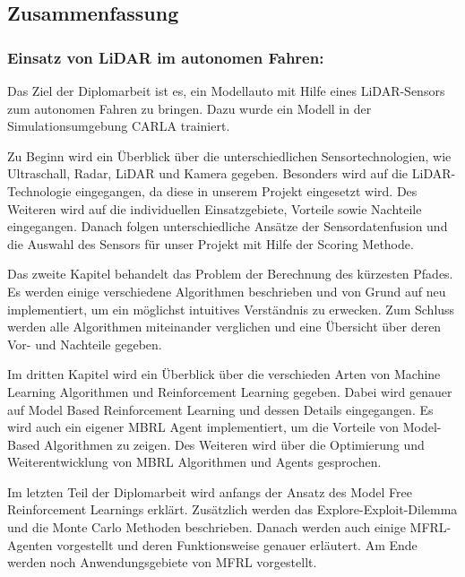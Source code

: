 \begin{flushleft}
	
	\subsection*{Zusammenfassung}

    	\subsubsection*{Einsatz von LiDAR im autonomen Fahren:}

            Das Ziel der Diplomarbeit ist es, ein Modellauto mit Hilfe eines LiDAR-Sensors zum autonomen Fahren zu bringen. Dazu wurde ein Modell in der Simulationsumgebung CARLA trainiert.
            
            Zu Beginn wird ein Überblick über die unterschiedlichen Sensortechnologien, wie Ultraschall, Radar, LiDAR und Kamera gegeben. Besonders wird auf die LiDAR-Technologie eingegangen, da diese in unserem Projekt eingesetzt wird. Des Weiteren wird auf die individuellen Einsatzgebiete, Vorteile sowie Nachteile eingegangen. Danach folgen unterschiedliche Ansätze der Sensordatenfusion und die Auswahl des Sensors für unser Projekt mit Hilfe der Scoring Methode. 
             
            Das zweite Kapitel behandelt das Problem der Berechnung des kürzesten Pfades. Es werden einige verschiedene Algorithmen beschrieben und von Grund auf neu implementiert, um ein möglichst intuitives Verständnis zu erwecken. Zum Schluss werden alle Algorithmen miteinander verglichen und eine Übersicht über deren Vor- und Nachteile gegeben.
            
            Im dritten Kapitel wird ein Überblick über die verschieden Arten von Machine
            Learning Algorithmen und Reinforcement Learning gegeben. Dabei wird genauer auf Model Based Reinforcement Learning und dessen Details eingegangen. Es wird auch ein eigener MBRL Agent implementiert, um die Vorteile von Model-Based Algorithmen zu zeigen. Des Weiteren wird über die Optimierung und Weiterentwicklung von MBRL Algorithmen und Agents gesprochen.
            
            Im letzten Teil der Diplomarbeit wird anfangs der Ansatz des Model Free Reinforcement Learnings erklärt. Zusätzlich werden das Explore-Exploit-Dilemma und die Monte Carlo Methoden beschrieben. Danach werden auch einige MFRL-Agenten vorgestellt und deren Funktionsweise genauer erläutert. Am Ende werden noch Anwendungsgebiete von MFRL vorgestellt.

\end{flushleft}
